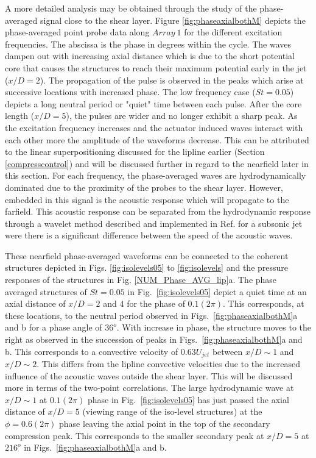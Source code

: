 \documentclass[english]{aiaa-tc}
\begin{document}
A more detailed analysis may be obtained through the study of the phase-averaged signal close to the shear layer.
Figure \ref{fig:phaseaxialbothM} depicts the phase-averaged point probe data along $Array~1$ for the different excitation frequencies. The abscissa is the phase in degrees within the cycle. The waves dampen out with increasing axial distance which is due to the short potential core that causes the structures to reach their maximum potential early in the jet ($x/D=2$). %
The propagation of the pulse is observed in the peaks which arise at
successive locations with increased phase. The low frequency case
($St=0.05$) depicts a long neutral period or "quiet" time between each
pulse. After the core length ($x/D=5$), the pulses are wider and no
longer exhibit a sharp peak.
As the excitation frequency increases and the actuator induced waves interact with each other more the amplitude of the waveforms decrease. This can be attributed to the linear superpositioning discussed for the lipline earlier (Section \ref{compresscontrol}) and will be discussed further in regard to the nearfield later in this section.
For each frequency, the phase-averaged waves are hydrodynamically dominated due to the proximity of the probes to the shear layer. However, embedded in this signal is the acoustic response which will propagate to the farfield. This acoustic response can be separated from the hydrodynamic response through a wavelet method described and implemented in Ref. \cite{Crawley2015} for a subsonic jet were there is a significant difference between the speed of the acoustic waves.

These nearfield phase-averaged waveforms can be connected to the coherent structures depicted in Figs. \ref{fig:isolevels05} to \ref{fig:isolevels} and the pressure responses of the structures in Fig. \ref{NUM_Phase_AVG_lip}a.
The phase averaged structures of $St=0.05$ in
Fig.~\ref{fig:isolevels05} depict a quiet time at an axial distance of $x/D=2$
and $4$ for the phase of $0.1(2\pi)$. This corresponds, at these
locations, to the neutral period observed in Figs.~\ref{fig:phaseaxialbothM}a and b for
a phase angle of $36^o$.  With increase in phase, the structure moves
to the right as observed in the succession of peaks in
Figs.~\ref{fig:phaseaxialbothM}a and b.  This corresponds to a convective
velocity of $0.63U_{jet}$ between $x/D\sim 1$ and $x/D\sim 2$. This differs from the lipline convective velocities due to the increased influence of the acoustic waves outside the shear layer. This will be discussed more in terms of the two-point correlations.
The large hydrodynamic wave at $x/D\sim 1$ at
$0.1(2\pi)$ phase in Fig.~\ref{fig:isolevels05} has just passed the axial
distance of $x/D=5$ (viewing range of the iso-level structures) at the
$\phi=0.6(2\pi)$ phase leaving the axial point in the top of the secondary compression peak. This corresponds to the smaller secondary peak at
$x/D=5$ at $216^o$ in Figs.~\ref{fig:phaseaxialbothM}a and b.
\end{document}
